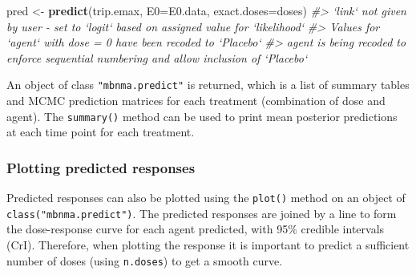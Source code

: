 \documentclass[]{article}
\newenvironment{Shaded}{\begin{snugshade}}{\end{snugshade}}
\newcommand{\CommentTok}[1]{\textcolor[rgb]{0.56,0.35,0.01}{\textit{#1}}}
\newcommand{\DataTypeTok}[1]{\textcolor[rgb]{0.13,0.29,0.53}{#1}}
\newcommand{\KeywordTok}[1]{\textcolor[rgb]{0.13,0.29,0.53}{\textbf{#1}}}
\newcommand{\NormalTok}[1]{#1}
\newcommand{\StringTok}[1]{\textcolor[rgb]{0.31,0.60,0.02}{#1}}
\begin{document}
\begin{Shaded}
\begin{Highlighting}[]
\NormalTok{pred <-}\StringTok{ }\KeywordTok{predict}\NormalTok{(trip.emax, }\DataTypeTok{E0=}\NormalTok{E0.data,}
                      \DataTypeTok{exact.doses=}\NormalTok{doses)}
\CommentTok{#> `link` not given by user - set to `logit` based on assigned value for `likelihood`}
\CommentTok{#> Values for `agent` with dose = 0 have been recoded to `Placebo`}
\CommentTok{#> agent is being recoded to enforce sequential numbering and allow inclusion of `Placebo`}
\end{Highlighting}
\end{Shaded}

An object of class \texttt{"mbnma.predict"} is returned, which is a list
of summary tables and MCMC prediction matrices for each treatment
(combination of dose and agent). The \texttt{summary()} method can be
used to print mean posterior predictions at each time point for each
treatment.

\begin{Shaded}
\end{Shaded}

\hypertarget{plotting-predicted-responses}{%
\subsubsection{Plotting predicted
responses}\label{plotting-predicted-responses}}

Predicted responses can also be plotted using the \texttt{plot()} method
on an object of \texttt{class("mbnma.predict")}. The predicted responses
are joined by a line to form the dose-response curve for each agent
predicted, with 95\% credible intervals (CrI). Therefore, when plotting
the response it is important to predict a sufficient number of doses
(using \texttt{n.doses}) to get a smooth curve.
\end{document}
